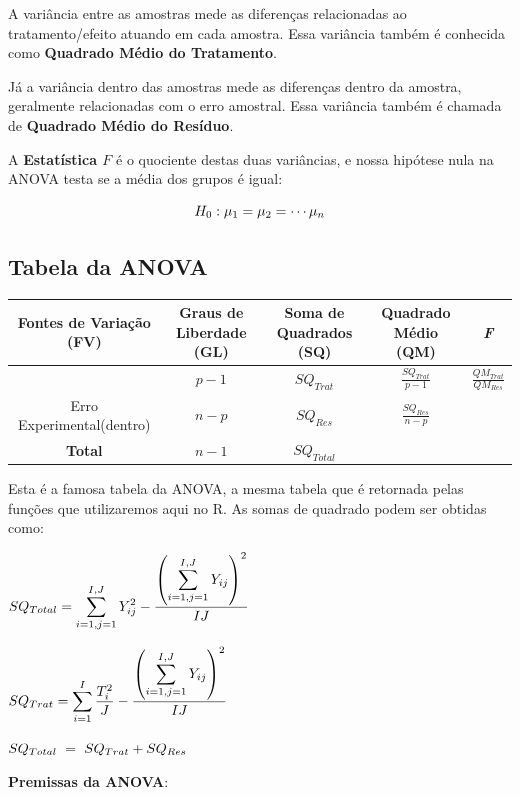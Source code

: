 \documentclass[
  letterpaper,
  DIV=11,
  numbers=noendperiod,
  oneside]{scrartcl}
\begin{document}
A variância entre as amostras mede as diferenças relacionadas ao
tratamento/efeito atuando em cada amostra. Essa variância também é
conhecida como \textbf{Quadrado Médio do Tratamento}.

Já a variância dentro das amostras mede as diferenças dentro da amostra,
geralmente relacionadas com o erro amostral. Essa variância também é
chamada de \textbf{Quadrado Médio do Resíduo}.

A \textbf{Estatística \(F\)} é o quociente destas duas variâncias, e
nossa hipótese nula na ANOVA testa se a média dos grupos é igual:

\[\large H_0: \mu_1 = \mu_2 = \cdots \mu_n\]

\subsection{Tabela da ANOVA}\label{tabela-da-anova}

\begin{table}
\fontsize{12.0pt}{14.4pt}\selectfont
\begin{tabular*}{0.9\linewidth}{@{\extracolsep{\fill}}ccccc}
\toprule
\textbf{Fontes de Variação (FV)} & \textbf{Graus de Liberdade (GL)} & \textbf{Soma de Quadrados (SQ)} & \textbf{Quadrado Médio (QM)} & \emph{\textbf{F}} \\ 
\midrule\addlinespace[2.5pt]
{Tratamento(entre)} & {\(p-1\)} & {\(SQ_{Trat}\)} & {\(\frac{SQ_{Trat}}{p-1}\)} & {\(\frac{QM_{Trat}}{QM_{Res}}\)} \\ 
{Erro Experimental(dentro)} & {\(n-p\)} & {\(SQ_{Res}\)} & {\(\frac{SQ_{Res}}{n-p}\)} & {} \\ 
{\textbf{Total}} & {\(n-1\)} & {\(SQ_{Total}\)} & {} & {} \\ 
\bottomrule
\end{tabular*}
\end{table}

Esta é a famosa tabela da ANOVA, a mesma tabela que é retornada pelas
funções que utilizaremos aqui no R. As somas de quadrado podem ser
obtidas como:

\(\small \displaystyle SQ_{Total} = \sum_{i=1,j=1}^{I,J}Y_{ij}^2 - \frac{\displaystyle \left( \sum_{i=1,j=1}^{I,J}Y_{ij}\right)^2}{IJ}\)

\(\small \displaystyle SQ_{Trat} = \sum_{i=1}^{I}\frac{T_{i}^2}{J} - \frac{\displaystyle \left( \sum_{i=1,j=1}^{I,J}Y_{ij}\right)^2}{IJ}\)

\(\small SQ_{Total} \ = \ SQ_{Trat} + SQ_{Res}\)

\textbf{Premissas da ANOVA}:
\end{document}

